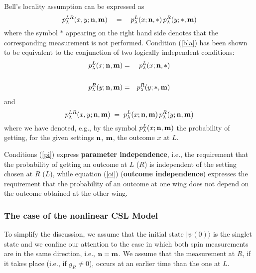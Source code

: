 \documentclass[10pt,a4paper]{article}
\begin{document}
Bell's locality assumption can be expressed as
\begin{equation} \label{bla}
p^{LR}_{\lambda}(x,y;{\bf n}, {\bf m}) \quad = \quad
p^{L}_{\lambda}(x;{\bf n}, *)\, p^{R}_{\lambda}(y; *, {\bf m})
\end{equation}
where the symbol $*$ appearing on the right hand side denotes that
the corresponding measurement is not performed. Condition
(\ref{bla}) has been shown \cite{ja84,shi1} to be equivalent to
the conjunction of two logically independent conditions:
\begin{eqnarray} \label{pi}
p^{L}_{\lambda}(x;{\bf n}, {\bf m}) & = & p^{L}_{\lambda}(x;{\bf
n}, *)
\nonumber \\ & &  \\
p^{R}_{\lambda}(y;{\bf n}, {\bf m}) & = & p^{R}_{\lambda}(y; *,
{\bf m}) \nonumber
\end{eqnarray}
and
\begin{equation} \label{oi}
p^{LR}_{\lambda}(x,y;{\bf n}, {\bf m}) \; = \;
p^{L}_{\lambda}(x;{\bf n}, {\bf m})\, p^{R}_{\lambda}(y;{\bf n},
{\bf m})
\end{equation}
where we have denoted, e.g., by the symbol $p^{L}_{\lambda}(x;{\bf
n}, {\bf m})$ the probability of getting, for the given settings
${\bf n}$, ${\bf m}$, the outcome $x$ at $L$.

Conditions (\ref{pi}) express {\bf parameter independence}, i.e.,
the requirement that the probability of getting an outcome at $L$
($R$) is independent of the setting chosen at $R$ ($L$), while
equation (\ref{oi}) ({\bf outcome independence}) expresses the
requirement that the probability of an outcome at one wing does
not depend on the outcome obtained at the other wing.


\subsubsection{The case of the nonlinear CSL Model}
\label{sec1131}

To simplify the discussion, we assume that the initial state
$|\psi(0)\rangle$ is the singlet state and we confine our
attention to the case in which both spin measurements are in the
same direction, i.e., ${\bf n} = {\bf m}$. We assume that the
measurement at $R$, if it takes place (i.e., if $g_{R} \neq 0$),
occurs at an earlier time than the one at $L$.
\end{document}
